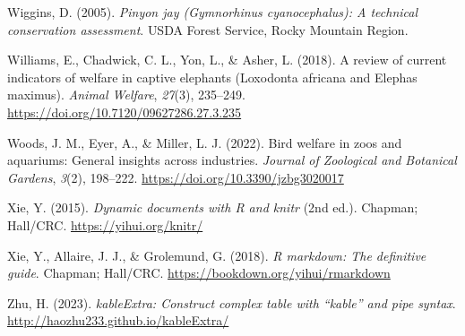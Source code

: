 \documentclass[
  pub]{apa6}
\newlength{\cslhangindent}
\newlength{\cslentryspacingunit} %
\newenvironment{CSLReferences}[2] %
 {%
  \setlength{\parindent}{0pt}
  \ifodd #1
  \let\oldpar\par
  \def\par{\hangindent=\cslhangindent\oldpar}
  \fi
  \setlength{\parskip}{#2\cslentryspacingunit}
 }%
 {}
\begin{document}
\begin{CSLReferences}{1}{0}
\leavevmode{}%
Wiggins, D. (2005). \emph{Pinyon jay ({Gymnorhinus} cyanocephalus): {A} technical conservation assessment}. {USDA Forest Service, Rocky Mountain Region}.

\leavevmode{}%
Williams, E., Chadwick, C. L., Yon, L., \& Asher, L. (2018). A review of current indicators of welfare in captive elephants ({Loxodonta} africana and {Elephas} maximus). \emph{Animal Welfare}, \emph{27}(3), 235--249. \url{https://doi.org/10.7120/09627286.27.3.235}

\leavevmode{}%
Woods, J. M., Eyer, A., \& Miller, L. J. (2022). Bird welfare in zoos and aquariums: {General} insights across industries. \emph{Journal of Zoological and Botanical Gardens}, \emph{3}(2), 198--222. \url{https://doi.org/10.3390/jzbg3020017}

\leavevmode{}%
Xie, Y. (2015). \emph{Dynamic documents with {R} and knitr} (2nd ed.). Chapman; Hall/CRC. \url{https://yihui.org/knitr/}

\leavevmode{}%
Xie, Y., Allaire, J. J., \& Grolemund, G. (2018). \emph{R markdown: The definitive guide}. Chapman; Hall/CRC. \url{https://bookdown.org/yihui/rmarkdown}

\leavevmode{}%
Zhu, H. (2023). \emph{{kableExtra}: Construct complex table with {``kable''} and pipe syntax}. \url{http://haozhu233.github.io/kableExtra/}

\end{CSLReferences}
\end{document}
